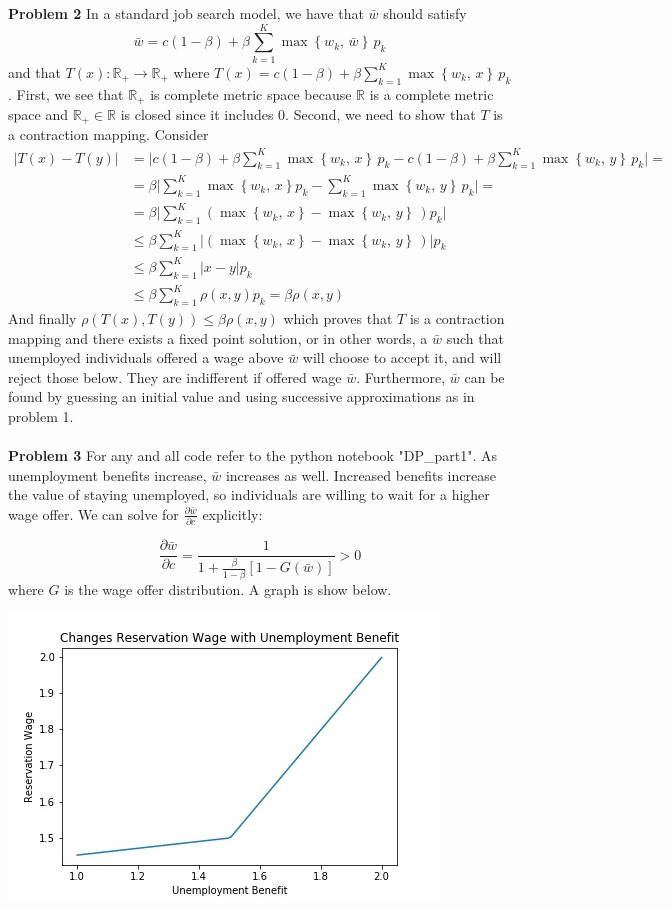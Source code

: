 \documentclass[letterpaper,12pt]{article}
\theoremstyle{definition}
\newcommand{\R}{\mathbb{R}}
\begin{document}
\noindent\textbf{Problem 2}
In a standard job search model, we have that $\bar w$ should satisfy 
$$
    \bar w
    = c (1-\beta) + \beta
    \sum_{k=1}^K \max \left\{
        w_k ,\, \bar w
    \right\}
    \, p_k
$$
and that $T(x): \R_+ \to \R_+$  where $T(x) =  c (1-\beta) + \beta \sum_{k=1}^K \max \left\{w_k ,\, x\right\} \, p_k$. First, we see that $\R_+$ is complete metric space because $\R$ is a complete metric space and $\R_+ \in \R$ is closed since it includes $0$. Second, we need to show that $T$ is a contraction mapping. Consider
\begin{equation*}
\begin{aligned}
 |T(x)- T(y)| & =  \big |c (1-\beta) + \beta \sum_{k=1}^K \max \left\{w_k ,\, x\right\} \, p_k - c (1-\beta) + \beta \sum_{k=1}^K \max \left\{w_k ,\, y\right\} \, p_k \big |=\\
& = \beta \big |\sum_{k=1}^K \max \left\{w_k ,\, x\right\}p_k - \sum_{k=1}^K \max \left\{w_k ,\, y\right\} \, p_k \big | = \\
& = \beta \big |\sum_{k=1}^K (\max \left\{w_k ,\, x\right\} -  \max \left\{w_k ,\, y\right\} \,) p_k \big |  \\
& \leq \beta \sum_{k=1}^K \big |(\max \left\{w_k ,\, x\right\} -  \max \left\{w_k ,\, y\right\} \,) \big |p_k   \\
& \leq \beta \sum_{k=1}^K | x - y | p_k \\
&\leq \beta \sum_{k=1}^K \rho(x,y) p_k = \beta \rho(x,y)
\end{aligned}
\end{equation*} 
And finally $\rho(T(x), T(y)) \leq \beta \rho(x,y)$ which proves that $T$ is a contraction mapping and there exists a fixed point solution, or in other words, a $\bar w$ such that unemployed individuals offered a wage above $\bar w$ will choose to accept it, and will reject those below. They are indifferent if offered wage $\bar w$. Furthermore, $\bar w$ can be found by guessing an initial value and using successive approximations as in problem 1. \\\\
\noindent\textbf{Problem 3} 
For any and all code refer to the python notebook "DP\_part1". As unemployment benefits increase, $\bar w$ increases as well. Increased benefits increase the value of staying unemployed, so individuals are willing to wait for a higher wage offer. We can solve for $\frac{\partial \bar w}{\partial c}$ explicitly: 

$$\frac{\partial \bar w}{\partial c} = \frac{1}{1+\frac{\beta}{1-\beta}[1-G(\bar w)]} > 0$$
where $G$ is the wage offer distribution.  A graph is show below. 

\includegraphics{rwage.jpeg}
\end{document}

